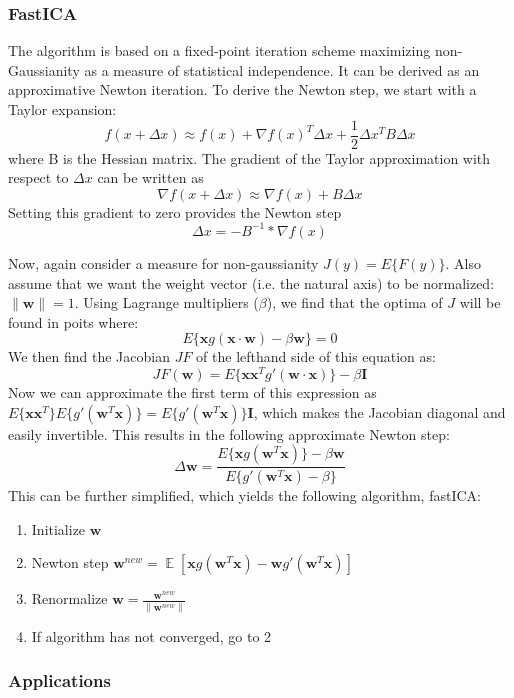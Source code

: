 \documentclass[11pt]{article}
\DeclareMathOperator{\E}{\mathbb{E}}
\newcommand{\vectornorm}[1]{\left\|#1\right\|}
\begin{document}
\subsubsection{FastICA}
The algorithm is based on a fixed-point iteration scheme maximizing non-Gaussianity as a measure of statistical independence. It can be derived as an approximative Newton iteration. To derive the Newton step, we start with a Taylor expansion:
\[
	f(x + \Delta x) \approx f(x) + \nabla f(x)^T \Delta x + \frac{1}{2} \Delta x^T B \Delta x
\]
where B is the Hessian matrix. The gradient of the Taylor approximation with respect to $\Delta x$ can be written as
\[
	\nabla f(x + \Delta x) \approx \nabla f(x) + B \Delta x
\]
Setting this gradient to zero provides the Newton step
\[
	\Delta x = - B^{-1} * \nabla f(x)
\]

Now, again consider a measure for non-gaussianity $J(y) = E\{F(y)\}$. Also assume that we want the weight vector (i.e. the natural axis) to be normalized: $\|\mathbf{w}\| = 1$. Using Lagrange multipliers ($\beta$), we find that the optima of $J$ will be found in poits where:
\[E\{\mathbf{x}g(\mathbf{x}\cdot\mathbf{w}) - \beta\mathbf{w}\}= 0\]
We then find the Jacobian $JF$ of the lefthand side of this equation as:
\[ JF(\mathbf{w}) = E\{\mathbf{x}\mathbf{x}^T g'(\mathbf{w}\cdot\mathbf{x})\} - \beta\mathbf{I}\]
Now we can approximate the first term of this expression as $E\{\mathbf{x}\mathbf{x}^T\}E\{g'(\mathbf{w}^T\mathbf{x})\} = E\{g'(\mathbf{w}^T\mathbf{x})\}\mathbf{I}$, which makes the Jacobian diagonal and easily invertible. This results in the following approximate Newton step:
\[\Delta \mathbf{w} = \frac{E\{\mathbf{x}g(\mathbf{w}^T\mathbf{x})\} - \beta\mathbf{w}}{E\{g'(\mathbf{w}^T\mathbf{x}) - \beta\}}\]
This can be further simplified, which yields the following algorithm, fastICA:

\begin{enumerate}
\item Initialize $\mathbf{w}$
\item Newton step $\mathbf{w}^{new}=\E \left[\mathbf{x}g(\mathbf{w}^T\mathbf{x})-\mathbf{w}g'(\mathbf{w}^T\mathbf{x})\right]$
\item Renormalize $\mathbf{w}=\frac{\mathbf{w}^{new}}{\vectornorm{\mathbf{w}^{new}}}$
\item If algorithm has not converged, go to 2
\end{enumerate}

\subsubsection{Applications}
\end{document}
